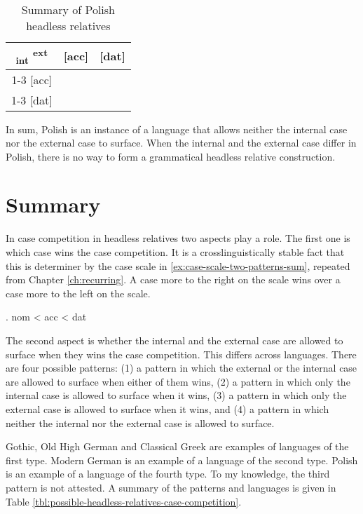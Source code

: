 \begin{table}[H]
  \center
  \caption{Summary of Polish headless relatives}
  \begin{tabular}{c|c|c}
    \toprule
    \textsubscript{\ac{int}} \textsuperscript{\ac{ext}}
           & [\ac{acc}]
           & [\ac{dat}]
           \\ \cmidrule{1-3}
       [\ac{acc}]
           & \xcancel{\phantom{xx}}
           & \cellcolor{LG}{*}
           \\ \cmidrule{1-3}
       [\ac{dat}]
           & \cellcolor{DG}{*}
           & \xcancel{\phantom{xx}}
           \\
     \bottomrule
  \end{tabular}
    \label{tbl:case-competition-polish}
\end{table}

In sum, Polish is an instance of a language that allows neither the internal case nor the external case to surface. When the internal and the external case differ in Polish, there is no way to form a grammatical headless relative construction.

\section{Summary}\label{sec:summary-2-patterns}

In case competition in headless relatives two aspects play a role. The first one is which case wins the case competition. It is a crosslinguistically stable fact that this is determiner by the case scale in \ref{ex:case-scale-two-patterns-sum}, repeated from Chapter \ref{ch:recurring}. A case more to the right on the scale wins over a case more to the left on the scale.

\ex. \ac{nom} < \ac{acc} < \ac{dat}\label{ex:case-scale-two-patterns-sum}

The second aspect is whether the internal and the external case are allowed to surface when they wins the case competition. This differs across languages. There are four possible patterns: (1) a pattern in which the external or the internal case are allowed to surface when either of them wins, (2) a pattern in which only the internal case is allowed to surface when it wins, (3) a pattern in which only the external case is allowed to surface when it wins, and (4) a pattern in which neither the internal nor the external case is allowed to surface.

Gothic, Old High German and Classical Greek are examples of languages of the first type. Modern German is an example of a language of the second type. Polish is an example of a language of the fourth type. To my knowledge, the third pattern is not attested. A summary of the patterns and languages is given in Table \ref{tbl:possible-headless-relatives-case-competition}.

